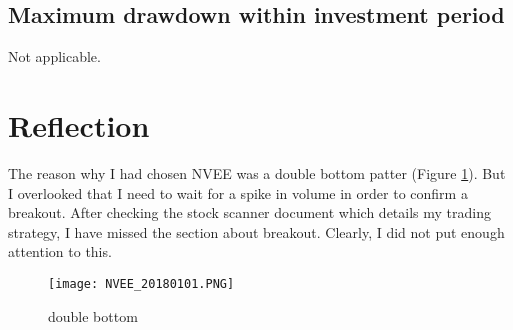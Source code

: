 \documentclass{article}
\begin{document}
\subsection{Maximum drawdown within investment period}
Not applicable.

\iffalse
\begin{figure}
\texttt{[image: 20170906-20171003\_dailyreturn.PNG]}
\end{figure}
\fi

\section{Reflection}
The reason why I had chosen NVEE was a double bottom patter (Figure \ref{double bottom}). But I overlooked that I need to wait for a spike in volume in order to confirm a breakout. After checking the stock scanner document which details my trading strategy, I have missed the section about breakout. Clearly, I did not put enough attention to this.

\begin{figure}[h]
	\caption{double bottom}
	\label{double bottom}
	\texttt{[image: NVEE\_20180101.PNG]}
\end{figure}
\end{document}
